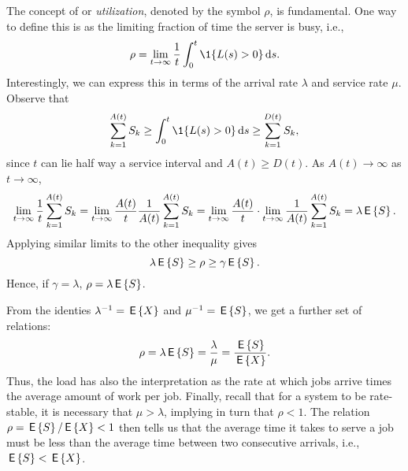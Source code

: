 The concept of  or \emph{utilization}, denoted by the
symbol $\rho$, is fundamental. One way to define this is  as the limiting
fraction of time the server is busy, i.e.,
\begin{equation*}
  \rho = \lim_{t\to\infty} \frac 1 t \int_0^t \1{L(s)>0} \d s.
\end{equation*}
Interestingly, we can express this in terms of the arrival rate
$\lambda$ and service rate $\mu$. Observe that
\begin{equation*}
  \sum_{k=1}^{A(t)} S_k \geq \int_0^t \1{L(s)>0} \d s \geq   \sum_{k=1}^{D(t)} S_k,
\end{equation*}
since $t$ can lie half way a service interval and $A(t) \geq D(t)$. As
$A(t)\to \infty$ as $t\to\infty$,
\begin{equation*}
  \lim_{t\to\infty} \frac 1 t\sum_{k=1}^{A(t)} S_k = 
  \lim_{t\to\infty} \frac{A(t)}t \frac{1}{A(t)} \sum_{k=1}^{A(t)} S_k = 
  \lim_{t\to\infty} \frac{A(t)}t \cdot \lim_{t\to\infty}\frac{1}{A(t)} \sum_{k=1}^{A(t)} S_k = \lambda \,\mathsf{E}\left\{S\right\}.
\end{equation*}
Applying similar limits to the other inequality gives
\begin{equation*}
\lambda \,\mathsf{E}\left\{S\right\} \geq \rho \geq \gamma \,\mathsf{E}\left\{S\right\}.
\end{equation*}
Hence, if $\gamma=\lambda$, $\rho = \lambda \,\mathsf{E}\left\{S\right\}$.  

From the identies $\lambda^{-1} = \,\mathsf{E}\left\{X\right\}$ and $\mu^{-1} = \,\mathsf{E}\left\{S\right\}$, we get
a further set of relations:
\begin{equation*}
  \rho = \lambda \,\mathsf{E}\left\{S\right\} = \frac{\lambda}{\mu} = \frac{\,\mathsf{E}\left\{S\right\}}{\,\mathsf{E}\left\{X\right\}}.
\end{equation*}
Thus, the load has also the interpretation as the rate at which jobs
arrive times the average amount of work per job.  Finally,
recall that for a system to be rate-stable, it is necessary that
$\mu> \lambda$, implying in turn that $\rho < 1$. The relation
$\rho=\,\mathsf{E}\left\{S\right\}/ \,\mathsf{E}\left\{X\right\} < 1$ then tells us that the average time it takes to
serve a job must be less than the average time between two consecutive
arrivals, i.e., $\,\mathsf{E}\left\{S\right\} < \,\mathsf{E}\left\{X\right\}$.


